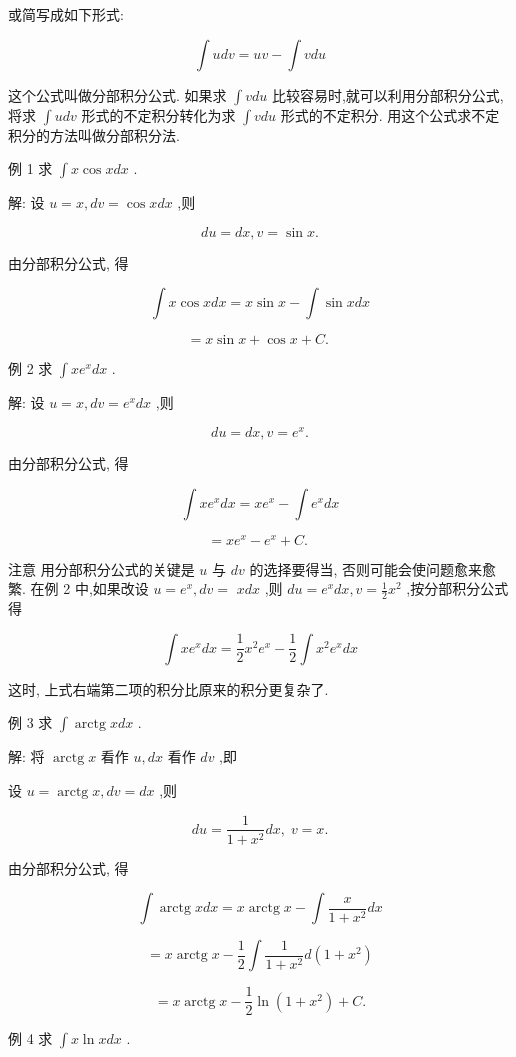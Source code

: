 \documentclass[lang=cn,newtx,10pt,scheme=chinese]{elegantbook}
\begin{document}
或简写成如下形式:

\[
\int {udv} = {uv} - \int {vdu}
\]

这个公式叫做分部积分公式. 如果求 \(\int {vdu}\) 比较容易时,就可以利用分部积分公式,将求 \(\int {udv}\) 形式的不定积分转化为求 \(\int {vdu}\) 形式的不定积分. 用这个公式求不定积分的方法叫做分部积分法.

例 1 求 \(\int x\cos {xdx}\) .

解: 设 \(u = x,{dv} = \cos {xdx}\) ,则

\[
{du} = {dx},v = \sin x.
\]

由分部积分公式, 得

\[
\int x\cos {xdx} = x\sin x - \int \sin {xdx}
\]

\[
= x\sin x + \cos x + C\text{. }
\]

例 2 求 \(\int x{e}^{x}{dx}\) .

解: 设 \(u = x,{dv} = {e}^{x}{dx}\) ,则

\[
{du} = {dx},v = {e}^{x}.
\]

由分部积分公式, 得

\[
\int x{e}^{x}{dx} = x{e}^{x} - \int {e}^{x}{dx}
\]

\[
= x{e}^{x} - {e}^{x} + C\text{. }
\]

注意 用分部积分公式的关键是 \(u\) 与 \({dv}\) 的选择要得当, 否则可能会使问题愈来愈繁. 在例 2 中,如果改设 \(u = {e}^{x},{dv} =\) \({xdx}\) ,则 \({du} = {e}^{x}{dx},v = \frac{1}{2}{x}^{2}\) ,按分部积分公式得

\[
\int x{e}^{x}{dx} = \frac{1}{2}{x}^{2}{e}^{x} - \frac{1}{2}\int {x}^{2}{e}^{x}{dx}
\]

这时, 上式右端第二项的积分比原来的积分更复杂了.

例 3 求 \(\int \operatorname{arctg}{xdx}\) .

解: 将 \(\operatorname{arctg}x\) 看作 \(u,{dx}\) 看作 \({dv}\) ,即

设 \(u = \operatorname{arctg}x,{dv} = {dx}\) ,则

\[
{du} = \frac{1}{1 + {x}^{2}}{dx},\;v = x.
\]

由分部积分公式, 得

\[
\int \operatorname{arctg}{xdx} = x\operatorname{arctg}x - \int \frac{x}{1 + {x}^{2}}{dx}
\]

\[
= x\operatorname{arctg}x - \frac{1}{2}\int \frac{1}{1 + {x}^{2}}d\left( {1 + {x}^{2}}\right)
\]

\[
= x\operatorname{arctg}x - \frac{1}{2}\ln \left( {1 + {x}^{2}}\right) + C\text{.}
\]

例 4 求 \(\int x\ln {xdx}\) .
\end{document}

